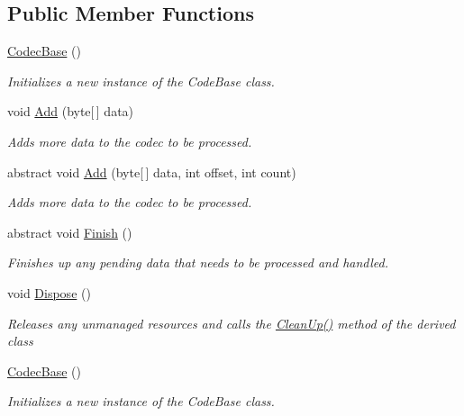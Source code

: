 \subsection*{Public Member Functions}
\begin{DoxyCompactItemize}
\item 
\hyperlink{class_dot_z_lib_1_1_codec_base_a1e372f5061c8f7c16a55bc41c55ebfa5}{Codec\+Base} ()
\begin{DoxyCompactList}\small\item\em Initializes a new instance of the {\ttfamily Code\+Base} class. \end{DoxyCompactList}\item 
void \hyperlink{class_dot_z_lib_1_1_codec_base_a9131ff23312ada67dbf58f428d562de4}{Add} (byte\mbox{[}$\,$\mbox{]} data)
\begin{DoxyCompactList}\small\item\em Adds more data to the codec to be processed. \end{DoxyCompactList}\item 
abstract void \hyperlink{class_dot_z_lib_1_1_codec_base_ab01e6ad1d9c5b05745dd9e487aaa40ee}{Add} (byte\mbox{[}$\,$\mbox{]} data, int offset, int count)
\begin{DoxyCompactList}\small\item\em Adds more data to the codec to be processed. \end{DoxyCompactList}\item 
abstract void \hyperlink{class_dot_z_lib_1_1_codec_base_abab96cb01a9b983452a31777e3a1e633}{Finish} ()
\begin{DoxyCompactList}\small\item\em Finishes up any pending data that needs to be processed and handled. \end{DoxyCompactList}\item 
void \hyperlink{class_dot_z_lib_1_1_codec_base_ab4bdcee97631d9e80d2bceb01d01f368}{Dispose} ()
\begin{DoxyCompactList}\small\item\em Releases any unmanaged resources and calls the \hyperlink{class_dot_z_lib_1_1_codec_base_aa0ded075105c5cf6f5f0d61928c90ca6}{Clean\+Up()} method of the derived class \end{DoxyCompactList}\item 
\hyperlink{class_dot_z_lib_1_1_codec_base_a1e372f5061c8f7c16a55bc41c55ebfa5}{Codec\+Base} ()
\begin{DoxyCompactList}\small\item\em Initializes a new instance of the {\ttfamily Code\+Base} class. \end{DoxyCompactList}\item 

\end{DoxyCompactItemize}
